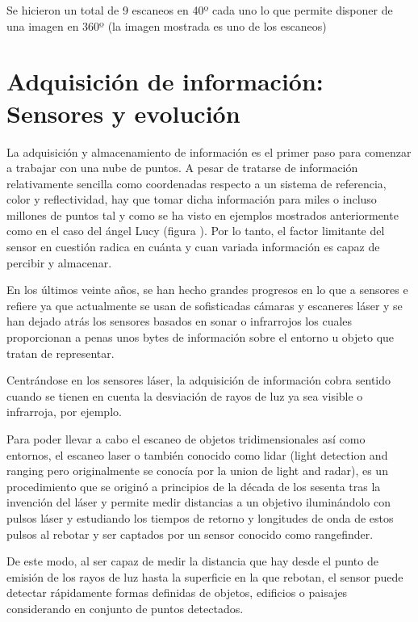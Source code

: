 Se hicieron un total de 9 escaneos en 40º cada uno lo que permite disponer de una imagen en 360º (la imagen mostrada es uno de los escaneos)




\section{Adquisición de información: Sensores y evolución}

La adquisición y almacenamiento de información es el primer paso para comenzar a trabajar con una nube de puntos. A pesar de tratarse de información relativamente sencilla como coordenadas respecto a un sistema de referencia, color y reflectividad, hay que tomar dicha información para miles o incluso millones de puntos tal y como se ha visto en ejemplos mostrados anteriormente como en el caso del ángel Lucy (figura ). Por lo tanto, el factor limitante del sensor en cuestión radica en cuánta y cuan variada información es capaz de percibir y almacenar.

En los últimos veinte años, se han hecho grandes progresos en lo que a sensores e refiere ya que actualmente se usan de sofisticadas cámaras y escaneres láser y se han dejado atrás los sensores basados en sonar o infrarrojos los cuales proporcionan a penas unos bytes de información sobre el entorno u objeto que tratan de representar.


Centrándose en los sensores láser, la adquisición de información cobra sentido cuando se tienen en cuenta la desviación de rayos de luz ya sea visible o infrarroja, por ejemplo.




 Para poder llevar a cabo el escaneo de objetos tridimensionales así como entornos, el escaneo laser o también conocido como lidar (light detection and ranging pero originalmente se conocía por la union de light and radar), 
es un procedimiento que se originó a principios de la década de los sesenta tras la invención del láser y permite medir distancias a un objetivo iluminándolo con pulsos láser y estudiando los tiempos de retorno y longitudes de onda de estos pulsos al rebotar y ser captados por un sensor conocido como rangefinder. 

De este modo, al ser capaz de medir la distancia que hay desde el punto de emisión de los rayos de luz hasta la superficie en la que rebotan, el sensor puede detectar rápidamente formas definidas de objetos, edificios o paisajes considerando en conjunto de puntos detectados.


